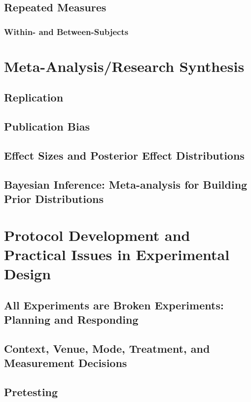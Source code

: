 \documentclass[12pt]{article}
\begin{document}
\subsection{Repeated Measures}
\subsubsection{Within- and Between-Subjects}



\section{Meta-Analysis/Research Synthesis}
\subsection{Replication}

\subsection{Publication Bias}

\subsection{Effect Sizes and Posterior Effect Distributions}

\subsection{Bayesian Inference: Meta-analysis for Building Prior Distributions}



\section{Protocol Development and Practical Issues in Experimental Design}
\subsection{All Experiments are Broken Experiments: Planning and Responding}

\subsection{Context, Venue, Mode, Treatment, and Measurement Decisions}

\subsection{Pretesting}
\end{document}
